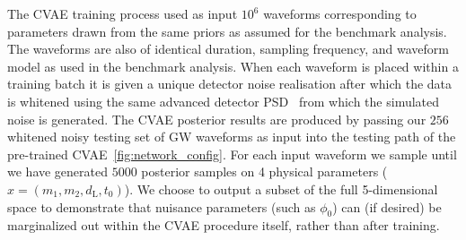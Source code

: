 \documentclass[%
showpacs,
 amsmath,amssymb,
 aps,
 twocolumn,
 prl,
 reprint,
floatfix,
]{revtex4-1}
\begin{document}
%
%
The \ac{CVAE} training process used as input $10^{6}$ waveforms corresponding
to parameters drawn from the same priors as assumed for the benchmark analysis.
The waveforms are also of identical duration, sampling frequency, and waveform
model as used in the benchmark analysis. When each waveform is placed within a
training batch it is given a unique detector noise realisation after which the
data is whitened using the same advanced detector
\ac{PSD}~\cite{2016LRR....19....1A} from which the simulated noise is
generated. The \ac{CVAE} posterior results are produced by passing our $256$
whitened noisy testing set of \ac{GW} waveforms as input into the testing path
of the pre-trained \ac{CVAE}~\ref{fig:network_config}. For each input waveform
we sample until we have generated $5000$ posterior samples on 4 physical
parameters ($x=(m_1,m_2,d_{\text{L}},t_{0})$). We choose to output a subset of
the full 5-dimensional space to demonstrate that nuisance parameters (such as
$\phi_0$) can (if desired) be marginalized out within the \ac{CVAE} procedure
itself, rather than after training. 
\end{document}
